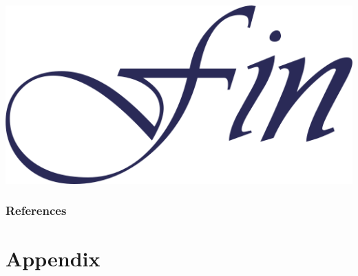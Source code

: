 \documentclass[aspectratio=169]{beamer}
\newlength{\frametextheight}
\begin{document}
\begin{frame}[plain]
    \begin{center}
        \includegraphics[height=0.7\frametextheight]{./images/fin}
    \end{center}
\end{frame}

\begin{frame}[allowframebreaks]
    \frametitle{References}
    
\end{frame}


\appendix

\section*{Appendix}
\end{document}
